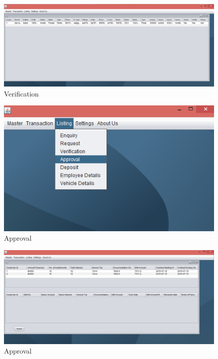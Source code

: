 \begin{figure}[ht]
\begin{center}
\includegraphics[scale=0.5]{images/image37.png}
\end{center}
\caption{Verification}
\label{Verification}
\end{figure}

\begin{figure}[ht]
\begin{center}
\includegraphics[scale=0.5]{images/image38.png}
\end{center}
\caption{Approval}
\label{Approval}
\end{figure}

\begin{figure}[ht]
\begin{center}
\includegraphics[scale=0.5]{images/image39.png}
\end{center}
\caption{Approval}
\label{Approval}
\end{figure}

